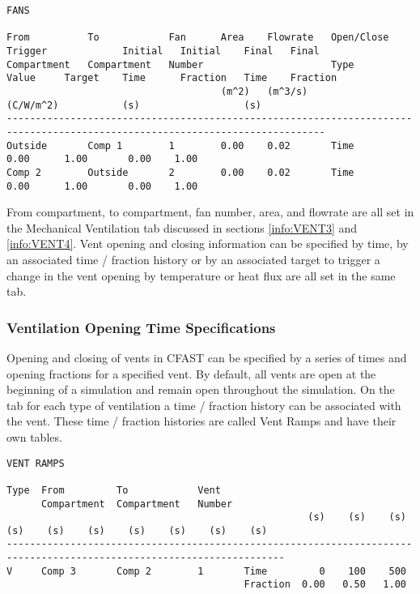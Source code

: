 \begin{lstlisting}[basicstyle=\tiny]
FANS

From          To            Fan      Area    Flowrate   Open/Close  Trigger             Initial   Initial    Final   Final
Compartment   Compartment   Number                      Type        Value     Target    Time      Fraction   Time    Fraction
                                     (m^2)   (m^3/s)                (C/W/m^2)           (s)                  (s)
-----------------------------------------------------------------------------------------------------------------------------
Outside       Comp 1        1        0.00    0.02       Time                            0.00      1.00       0.00    1.00
Comp 2        Outside       2        0.00    0.02       Time                            0.00      1.00       0.00    1.00
\end{lstlisting}
From compartment, to compartment, fan number, area, and flowrate are all set in the Mechanical Ventilation tab discussed in sections \ref{info:VENT3} and \ref{info:VENT4}.  Vent opening and closing information can be specified by time, by an associated time / fraction history or by an associated target to trigger a change in the vent opening by temperature or heat flux are all set in the same tab.


\subsubsection{Ventilation Opening Time Specifications}

Opening and closing of vents in CFAST can be specified by a series of times and opening fractions for a specified vent. By default, all vents are open at the beginning of a simulation and remain open throughout the simulation. On the tab for each type of ventilation a time / fraction history can be associated with the vent. These time / fraction histories are called Vent Ramps and have their own tables.
\begin{lstlisting}[basicstyle=\tiny]
VENT RAMPS

Type  From         To            Vent
      Compartment  Compartment   Number
                                                    (s)    (s)    (s)    (s)    (s)    (s)    (s)    (s)    (s)    (s)
----------------------------------------------------------------------------------------------------------------------
V     Comp 3       Comp 2        1       Time         0    100    500
                                         Fraction  0.00   0.50   1.00
\end{lstlisting}

